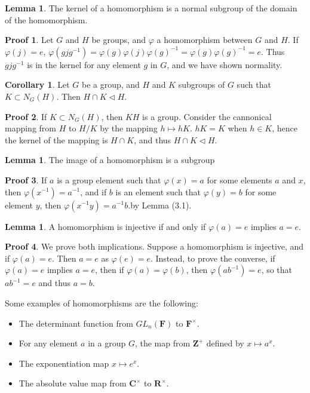 \documentclass[12pt]{amsbook}
\theoremstyle{definition}
\newtheorem{lemma}[theorem]{Lemma}
\newtheorem{corollary}[theorem]{Corollary}
\newtheorem*{prf}{Proof}
\newcommand{\bint}{\mathbf{Z}} %
\begin{document}
\begin{lemma} The kernel of a homomorphism is a normal subgroup of the domain of the homomorphism. \end{lemma}
\begin{prf} Let $G$ and $H$ be groups, and $\varphi$ a homomorphism between $G$ and $H$. If $\varphi(j)=e$, $\varphi(gjg^{-1}) = \varphi(g)\varphi(j)\varphi(g)^{-1} = \varphi(g)\varphi(g)^{-1} = e$. Thus $gjg^{-1}$ is in the kernel for any element $g$ in $G$, and we have shown normality. \end{prf}

\begin{corollary}
    Let $G$ be a group, and $H$ and $K$ subgroups of $G$ such that $K \subset N_G(H)$. Then $H \cap K \lhd H$.
\end{corollary}
\begin{prf}
    If $K \subset N_G(H)$, then $KH$ is a group. Consider the cannonical mapping from $H$ to $H/K$ by the mapping $h \mapsto hK$. $hK = K$ when $h \in K$, hence the kernel of the mapping is $H \cap K$, and thus $H \cap K \lhd H$.
\end{prf}

\begin{lemma} The image of a homomorphism is a subgroup \end{lemma}
\begin{prf} If $a$ is a group element such that $\varphi(x) = a$ for some elements $a$ and $x$, then $\varphi(x^{-1}) = a^{-1}$, and if $b$ is an element such that $\varphi(y) = b$ for some element $y$, then $\varphi(x^{-1}y) = a^{-1}b$.by Lemma (3.1). \end{prf}

\begin{lemma} A homomorphism is injective if and only if $\varphi(a) = e$ implies $a = e$. \end{lemma}
\begin{prf} We prove both implications. Suppose a homomorphism is injective, and if $\varphi(a) = e$. Then $a = e$ as $\varphi(e) = e$. Instead, to prove the converse, if $\varphi(a) = e$ implies $a = e$, then if $\varphi(a) = \varphi(b)$, then $\varphi(ab^{-1}) = e$, so that $ab^{-1} = e$ and thus $a = b$.
\end{prf}

Some examples of homomorphisms are the following:
\begin{itemize}
    \item The determinant function from $GL_n(\mathbf{F})$ to $\mathbf{F}^\times$.
    \item For any element $a$ in a group $G$, the map from $\bint^+$ defined by $x \mapsto a^x$.
    \item The exponentiation map $x \mapsto e^x$.
    \item The absolute value map from $\mathbf{C}^\times$ to $\mathbf{R}^\times$.
\end{itemize}
\end{document}
